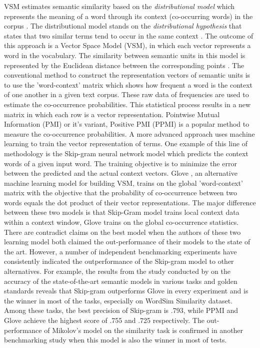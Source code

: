 \documentclass[Journal,InsideFigs, DoubleSpace]{ascelike} %
\begin{document}
VSM estimates semantic similarity based on the \textit{distributional model} which represents the meaning of a word through its context (co-occurring words) in the corpus \cite{erk12}. The distributional model stands on the \textit{distributional hypothesis} that states that two similar terms tend to occur in the same context \cite{Harris54}. The outcome of this approach is a Vector Space Model (VSM), in which each vector represents a word in the vocabulary. The similarity between semantic units in this model is represented by the Euclidean distance between the corresponding points \cite{erk12}. The conventional method to construct the representation vectors of semantic units is to use the 'word-context' matrix which shows how frequent a word is the context of one another in a given text corpus. These raw data of frequencies are used to estimate the co-occurrence probabilities. This statistical process results in a new matrix in which each row is a vector representation. Pointwise Mutual Information (PMI) \cite{church90} or it's variant, Positive PMI (PPMI) is a popular method to measure the co-occurrence probabilities. A more advanced approach uses machine learning to train the vector representation of terms. One example of this line of methodology is the Skip-gram neural network model \cite{mikolov13a} which predicts the context words of a given input word. The training objective is to minimize the error between the predicted and the actual context vectors. Glove \cite{pennington2014glove}, an alternative machine learning model for building VSM, trains on the global 'word-context' matrix with the objective that the probability of co-occurrence between two words equals the dot product of their vector representations. The major difference between these two models is that Skip-Gram model trains local context data within a context window, Glove trains on the global co-occurrence statistics. There are contradict claims on the best model when the authors of these two learning model both claimed the out-performance of their models to the state of the art. However, a number of independent benchmarking experiments have consistently indicated the outperformance of the Skip-gram model to other alternatives. For example, the results from the study conducted by  on the accuracy of the state-of-the-art semantic models in various tasks and golden standards reveals that Skip-gram outperforms Glove in every experiment and is the winner in most of the tasks, especially on WordSim Similarity dataset. Among these tasks, the best precision of Skip-gram is .793, while PPMI and Glove achieve the highest score of .755 and .725 respectively.  The out-performance of Mikolov's model on the similarity task is confirmed in another benchmarking study \cite{hill15} when this model is also the winner in most of tests. 
\end{document}
